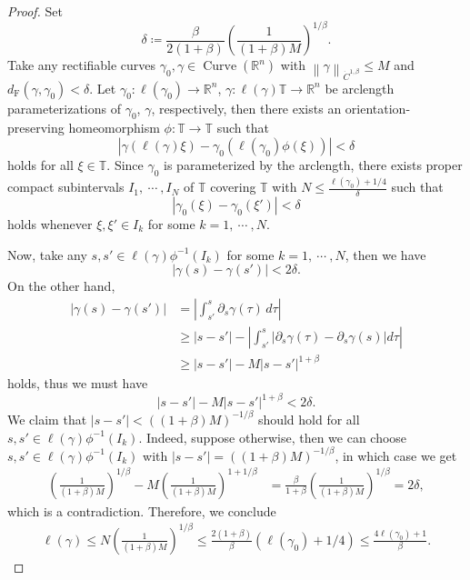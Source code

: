 \documentclass[reqno,centertags,12pt]{amsart}
\theoremstyle{definition}
\numberwithin{equation}{section}
\newcommand{\abs}[1]{\left\lvert#1\right\rvert}
\newcommand{\norm}[1]{\left\|#1\right\|}
\newcommand{\bbR}{{\mathbb{R}}}
\newcommand{\bbT}{{\mathbb{T}}}
\begin{document}
\begin{proof}
    Set
    \[
        \delta \coloneqq \frac{\beta}{2(1+\beta)}\left(\frac{1}{(1+\beta)M}\right)^{1/\beta}.
    \]
    Take any rectifiable curves $\gamma_{0},\gamma\in\operatorname{Curve}(\bbR^{n})$ with
    $\norm{\gamma}_{\dot{C}^{1,\beta}} \leq M$ and
    $d_{\mathrm{F}}(\gamma,\gamma_{0}) < \delta$.
    Let $\gamma_{0}\colon\ell(\gamma_{0})\to\bbR^{n}$, $\gamma\colon\ell(\gamma)\bbT\to\bbR^{n}$
    be arclength parameterizations of $\gamma_{0}$, $\gamma$, respectively,
    then there exists an orientation-preserving homeomorphism
    $\phi\colon\bbT\to\bbT$ such that
    \[
        \abs{\gamma(\ell(\gamma)\xi) - \gamma_{0}(\ell(\gamma_{0})\phi(\xi))} < \delta
    \]
    holds for all $\xi\in\bbT$. Since $\gamma_{0}$ is parameterized by the arclength,
    there exists proper compact subintervals $I_{1},\ \cdots\ ,I_{N}$ of $\bbT$
    covering $\bbT$ with $N\leq \frac{\ell(\gamma_{0}) + 1/4}{\delta}$ such that
    \[
        \abs{\gamma_{0}(\xi) - \gamma_{0}(\xi')} < \delta
    \]
    holds whenever $\xi,\xi' \in I_{k}$ for some $k=1,\ \cdots\ ,N$.

    Now, take any $s,s' \in \ell(\gamma)\phi^{-1}(I_{k})$ for some
    $k=1,\ \cdots\ ,N$, then we have
    \[
        \abs{\gamma(s) - \gamma(s')} < 2\delta.
    \]
    On the other hand,
    \begin{align*}
        \abs{\gamma(s) - \gamma(s')}
        &= \abs{\int_{s'}^{s}\partial_{s}\gamma(\tau)\,d\tau} \\
        &\geq \abs{s - s'}
        - \abs{\int_{s'}^{s}\abs{\partial_{s}\gamma(\tau) - \partial_{s}\gamma(s)}d\tau} \\
        &\geq \abs{s - s'} - M\abs{s - s'}^{1+\beta}
    \end{align*}
    holds, thus we must have
    \[
        \abs{s - s'} - M\abs{s - s'}^{1+\beta} < 2\delta.
    \]
    We claim that $\abs{s - s'} < ((1+\beta)M)^{-1/\beta}$ should hold
    for all $s,s'\in \ell(\gamma)\phi^{-1}(I_{k})$.
    Indeed, suppose otherwise, then we can choose $s,s'\in \ell(\gamma)\phi^{-1}(I_{k})$
    with $\abs{s - s'} = ((1+\beta)M)^{-1/\beta}$, in which case we get
    \begin{align*}
        \left(\frac{1}{(1+\beta)M}\right)^{1/\beta}
        - M\left(\frac{1}{(1+\beta)M}\right)^{1+1/\beta}
        &= \frac{\beta}{1+\beta}\left(\frac{1}{(1+\beta)M}\right)^{1/\beta}
        = 2\delta,
    \end{align*}
    which is a contradiction. Therefore, we conclude
    \begin{align*}
        \ell(\gamma) \leq N\left(\frac{1}{(1+\beta)M}\right)^{1/\beta}
        \leq \frac{2(1+\beta)}{\beta}(\ell(\gamma_{0}) + 1/4)
        \leq \frac{4\ell(\gamma_{0})+1}{\beta}.
    \end{align*}
\end{proof}
\end{document}

